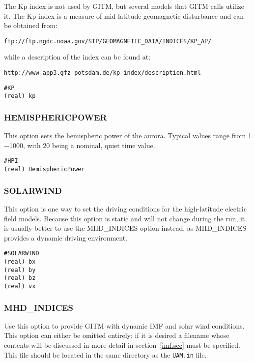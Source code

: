 The Kp index is not used by GITM, but several models that GITM calls utilize it.  The Kp index is a measure of mid-latitude geomagnetic disturbance and can be obtained from:

 {\tt ftp://ftp.ngdc.noaa.gov/STP/GEOMAGNETIC\_DATA/INDICES/KP\_AP/} 
 
 \noindent while a description of the index can be found at:
 
 {\tt http://www-app3.gfz-potsdam.de/kp\_index/description.html}

\begin{verbatim}
#KP
(real) kp  
\end{verbatim}

\subsubsection{HEMISPHERICPOWER}
\label{hemisphericpower.sec}

This option sets the hemispheric power of the aurora.  Typical values range from 1$-$1000, with 20 being a nominal, quiet time value.

\begin{verbatim}
#HPI
(real) HemisphericPower
\end{verbatim}

\subsubsection{SOLARWIND}
\label{solarwind.sec}

This option is one way to set the driving conditions for the high-latitude electric field models.  Because this option is static and will not change during the run, it is usually better to use the MHD\_INDICES option instead, as MHD\_INDICES provides a dynamic driving environment.

\begin{verbatim}
#SOLARWIND
(real) bx  
(real) by  
(real) bz  
(real) vx  
\end{verbatim}

\subsubsection{MHD\_INDICES}
\label{mhdindices.sec}

Use this option to provide GITM with dynamic IMF and solar wind conditions.  This option can either be omitted entirely; if it is desired a filename whose contents will be discussed in more detail in section~\ref{imf.sec} must be specified.  This file should be located in the same directory as the {\tt UAM.in} file.

